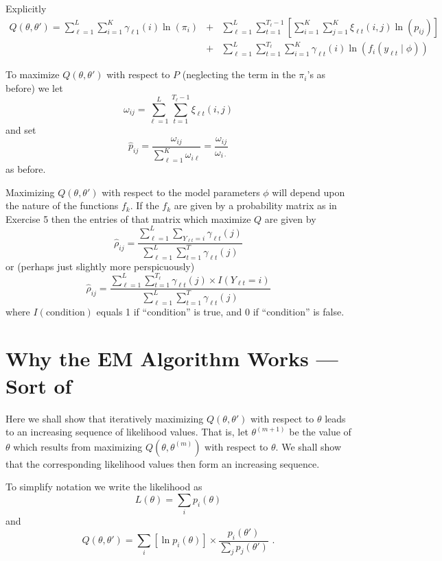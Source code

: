 Explicitly
\begin{eqnarray*}
Q(\theta, \theta') = \sum_{\ell=1}^L \sum_{i=1}^K \gamma_{\ell 1}(i)
                     \ln(\pi_i) & + &
\sum_{\ell=1}^L \sum_{t=1}^{T_{\ell}-1} \left[ \sum_{i=1}^K
                \sum_{j=1}^K \xi_{\ell t}(i,j) \ln(p_{ij}) \right] \\
   & + & \sum_{\ell=1}^L \sum_{t=1}^{T_{\ell}} \sum_{i=1}^K \gamma_{\ell t}(i)
         \ln(f_i(y_{\ell t} \;|\; \phi))
\end{eqnarray*}

To maximize $Q(\theta,\theta')$ with respect to $P$ (neglecting the
term in the $\pi_i$'s as before) we let
\[
\omega_{ij} = \sum_{\ell=1}^L \sum_{t=1}^{T_{\ell}-1} \xi_{\ell t}(i,j)
\]
and set
\[
\hat{p}_{ij} = \frac{\omega_{ij}} {\sum_{\ell=1}^K \omega_{i\ell}}
= \frac{\omega_{ij}}{\omega_{i\cdot}}
\]
as before.

Maximizing $Q(\theta,\theta')$ with respect to the model parameters
$\phi$ will depend upon the nature of the functions $f_k$.  If the
$f_k$ are given by a probability matrix as in Exercise 5 then the
entries of that matrix which maximize $Q$ are given by
\[
\hat{\rho}_{ij} = \frac{\sum_{\ell=1}^L \sum_{Y_{\ell t}=i} \gamma_{\ell t}(j)}
                  {\sum_{\ell=1}^L \sum_{t=1}^T \gamma_{\ell t}(j)}
\]
or (perhaps just slightly more perspicuously)
\[
\hat{\rho}_{ij} = \frac{\sum_{\ell=1}^L \sum_{t=1}^{T_{\ell}}
                  \gamma_{\ell t}(j) \times I(Y_{\ell t}=i)}
                  {\sum_{\ell=1}^L \sum_{t=1}^T \gamma_{\ell t}(j)}
\]
where $I(\mbox{condition})$ equals 1 if ``condition'' is true, and
0 if ``condition'' is false.

\section{Why the EM Algorithm Works --- Sort of}

Here we shall show that iteratively maximizing $Q(\theta,\theta')$
with respect to $\theta$ leads to an increasing sequence of
likelihood values.  That is, let $\theta^{(m+1)}$ be the value
of $\theta$ which results from maximizing $Q(\theta,\theta^{(m)})$
with respect to $\theta$.  We shall show that the corresponding
likelihood values then form an increasing sequence.

To simplify notation we write
the likelihood as
\[
L(\theta) = \sum_i p_i(\theta)
\]
and
\[
Q(\theta,\theta') = \sum_i [\ln p_i(\theta)] \times \frac{p_i(\theta')}
			{\sum_j p_j(\theta')} \mbox{ .}
\]

